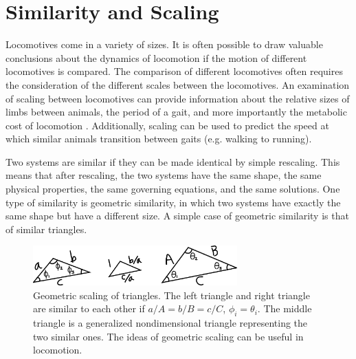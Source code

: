 \chapter{Similarity and Scaling} %
\label{sec:SimilarityAndScaling}

Locomotives come in a variety of sizes. It is often possible to draw valuable conclusions about the dynamics of locomotion if the motion of different locomotives is compared. The comparison of different locomotives often requires the consideration of the different scales between the locomotives. An examination of scaling between locomotives can provide information about the relative sizes of limbs between animals, the period of a gait, and more importantly the metabolic cost of locomotion \cite{mcmahon84}. Additionally, scaling can be used to predict the speed at which similar animals transition between gaits (e.g. walking to running). 

Two systems are similar if they can be made identical by simple rescaling. This means that after rescaling, the two systems have the same shape, the same physical properties, the same governing equations, and the same solutions. One type of similarity is geometric similarity, in which two systems have exactly the same shape but have a different size. A simple case of geometric similarity is that of similar triangles.

\begin{figure}[h]		%
\begin{centering}
\includegraphics[width=0.7\textwidth]{Figures/GeometricScaling}\par
\end{centering}
\caption[Diagram: Geometric Scaling of Triangles]{Geometric scaling of triangles. The left triangle and right triangle are similar to each other if $a/A = b/B = c/C$, $\phi_{i} = \theta_{i}$. The middle triangle is a generalized nondimensional triangle representing the two similar ones. The ideas of geometric scaling can be useful in locomotion.}
\label{fig:GeometricScaling}
\end{figure}
%


